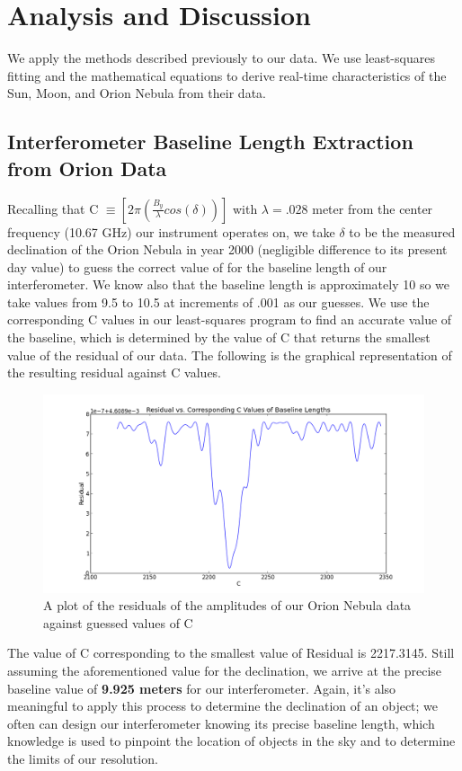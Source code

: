 \documentclass{article}
\begin{document}
\section{Analysis and Discussion}
We apply the methods described previously to our data. We use 
least-squares fitting and the mathematical equations to derive real-time 
characteristics of the Sun, Moon, and Orion Nebula from their data.  
\subsection{Interferometer Baseline Length Extraction from Orion Data}
Recalling that C $\equiv [2\pi(\frac{B_{y}}{\lambda}cos(\delta))]$ with
$\lambda = .028$ meter from the center frequency (10.67 GHz) our
instrument operates on, we take $\delta$ to be the measured declination
of the Orion Nebula in year 2000 (negligible difference to its present
day value) to guess the correct value of for the baseline length of our
interferometer. We know also that the baseline length is approximately
10 so we take values from 9.5 to 10.5 at increments of .001 as our
guesses. We use the corresponding C values in our least-squares program
to find an accurate value of the baseline, which is determined by the
value of C that returns the smallest value of the residual of our
data. The following is the graphical representation of the resulting
residual against C values. 
\begin{figure}[H]
\centering
\includegraphics[width=\textwidth]{baseline.png}
\caption{A plot of the residuals of the amplitudes of our Orion Nebula
  data against guessed values of C}
\end{figure}
The value of C corresponding to the smallest value of Residual is
2217.3145. Still assuming the aforementioned value for the declination,
we arrive at the precise baseline value of \textbf{9.925 meters} for our
interferometer. Again, it's also meaningful to apply this process to
determine the declination of an object; we often can design our
interferometer knowing its precise baseline length, which knowledge is
used to pinpoint the location of objects in the sky and to determine the
limits of our resolution.
\end{document}
